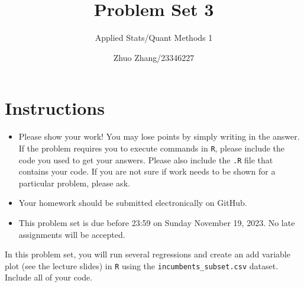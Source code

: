 \documentclass[12pt,letterpaper]{article}
\title{Problem Set 3}
\date{Zhuo Zhang/23346227}
\author{Applied Stats/Quant Methods 1}
\begin{document}
	\maketitle
	\section*{Instructions}
	\begin{itemize}
		\item Please show your work! You may lose points by simply writing in the answer. If the problem requires you to execute commands in \texttt{R}, please include the code you used to get your answers. Please also include the \texttt{.R} file that contains your code. If you are not sure if work needs to be shown for a particular problem, please ask.
	\item Your homework should be submitted electronically on GitHub.
	\item This problem set is due before 23:59 on Sunday November 19, 2023. No late assignments will be accepted.

	\end{itemize}

		\vspace{.25cm}
	
\noindent In this problem set, you will run several regressions and create an add variable plot (see the lecture slides) in \texttt{R} using the \texttt{incumbents\_subset.csv} dataset. Include all of your code.

	\vspace{.5cm}
\end{document}

